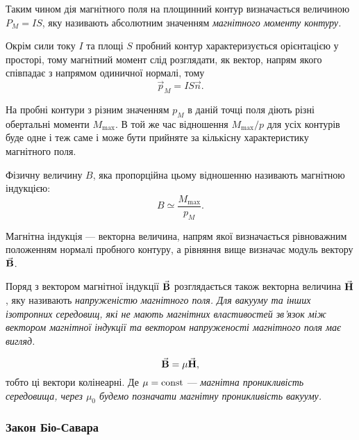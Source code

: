 \begin{definition}
	Таким чином дія магнітного поля на площинний контур визначається величиною $P_M = I S$, яку називають абсолютним значенням \it{магнітного моменту контуру}.
\end{definition}

Окрім сили току $I$ та площі $S$ пробний контур характеризується орієнтацією у просторі, тому магнітний момент слід розглядати, як вектор, напрям якого співпадає з напрямом одиничної нормалі, тому
\begin{equation}
	\vec p_M = I S \vec n.
\end{equation}

На пробні контури з різним значенням $p_M$ в даній точці поля діють різні обертальні моменти $M_{\text{max}}$. В той же час відношення $M_{\text{max}} / p$ для усіх контурів буде одне і теж саме і може бути прийняте за кількісну характеристику магнітного поля. 

\begin{definition}[індукції]
	Фізичну величину $B$, яка пропорційна цьому відношенню називають магнітною індукцією:
	\begin{equation}
		B \simeq \frac{M_{\text{max}}}{p_M}.
	\end{equation}
\end{definition}

Магнітна індукція --- векторна величина, напрям якої визначається рівноважним положенням нормалі пробного контуру, а рівняння вище визначає модуль вектору ${\vec{\mathbf{B}}}$.

\begin{definition}
	Поряд з вектором магнітної індукції ${\vec{\mathbf{B}}}$ розглядається також векторна величина ${\vec{\mathbf{H}}}$, яку називають \it{напруженістю магнітного поля}. Для вакууму та інших ізотропних середовищ, які не мають магнітних властивостей зв'язок між вектором магнітної індукції та вектором напруженості магнітного поля має вигляд. 
	
	\begin{equation}
		{\vec{\mathbf{B}}} = \mu {\vec{\mathbf{H}}},
	\end{equation}
	тобто ці вектори колінеарні.
	Де 	$\mu = \operatorname{const}$ --- \it{магнітна проникливість середовища}, через $\mu_0$ будемо позначати магнітну проникливість вакууму.
\end{definition}

\subsubsection{Закон Біо-Савара}

